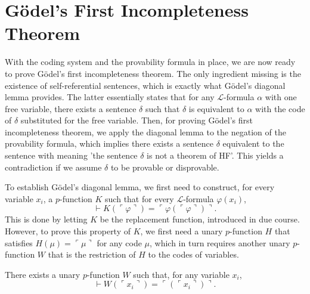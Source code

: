 \chapter{Gödel’s First Incompleteness Theorem}

With the coding system and the provability formula in place, 
we are now ready to prove Gödel’s first incompleteness theorem.
The only ingredient missing is the existence of self-referential sentences, 
which is exactly what Gödel’s diagonal lemma provides.
The latter essentially states that for any $\mathcal{L}$-formula $\alpha$ with one free variable,
there exists a sentence $\delta$ such that $\delta$ is equivalent to $\alpha$ with the code
of $\delta$ substituted for the free variable.
Then, for proving Gödel’s first incompleteness theorem, we apply the diagonal lemma to the negation
of the provability formula, which implies there exists a sentence $\delta$ equivalent to the 
sentence with meaning 'the sentence $\delta$ is not a theorem of HF'.
This yields a contradiction if we assume $\delta$ to be provable or disprovable.

To establish Gödel’s diagonal lemma, we first need to construct, for every variable $x_i$, 
a $p$-function $K$ such that for every $\mathcal{L}$-formula $\varphi(x_i)$,
$$
\vdash K (\ulcorner{\varphi}\urcorner) = \ulcorner{\varphi(\ulcorner {\varphi} \urcorner)}\urcorner.
$$
This is done by letting $K$ be the replacement function, introduced in due course.
However, to prove this property of $K$, we first need a unary $p$-function $H$
that satisfies $H(\mu) = \ulcorner {\mu} \urcorner$ for any code $\mu$, which in turn requires
another unary $p$-function $W$ that is the restriction of $H$ to the codes of variables.

\begin{lemma}
    \label{lem:Code.exists_pFunc_forall_var_eq_code}
    There exists a unary $p$-function $W$ such that, for any variable $x_i$,
    $$
    \vdash W(\ulcorner{x_i}\urcorner) = \ulcorner{(\ulcorner{x_i}\urcorner)}\urcorner.
    $$
\end{lemma}

